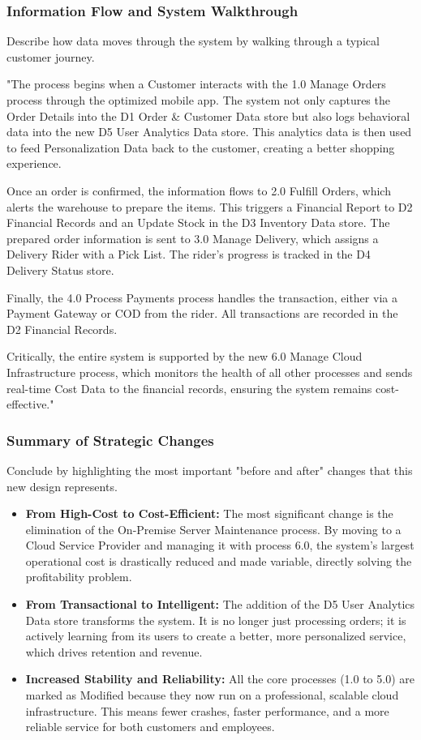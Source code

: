 \documentclass[12pt,a4paper]{article}
\begin{document}
\subsubsection{Information Flow and System Walkthrough}
Describe how data moves through the system by walking through a typical customer journey.

"The process begins when a Customer interacts with the 1.0 Manage Orders process through the optimized mobile app. The system not only captures the Order Details into the D1 Order \& Customer Data store but also logs behavioral data into the new D5 User Analytics Data store. This analytics data is then used to feed Personalization Data back to the customer, creating a better shopping experience.

Once an order is confirmed, the information flows to 2.0 Fulfill Orders, which alerts the warehouse to prepare the items. This triggers a Financial Report to D2 Financial Records and an Update Stock in the D3 Inventory Data store. The prepared order information is sent to 3.0 Manage Delivery, which assigns a Delivery Rider with a Pick List. The rider's progress is tracked in the D4 Delivery Status store.

Finally, the 4.0 Process Payments process handles the transaction, either via a Payment Gateway or COD from the rider. All transactions are recorded in the D2 Financial Records.

Critically, the entire system is supported by the new 6.0 Manage Cloud Infrastructure process, which monitors the health of all other processes and sends real-time Cost Data to the financial records, ensuring the system remains cost-effective."

\subsubsection{Summary of Strategic Changes}
Conclude by highlighting the most important "before and after" changes that this new design represents.

\begin{itemize}[leftmargin=*]
    \item \textbf{From High-Cost to Cost-Efficient:} The most significant change is the elimination of the On-Premise Server Maintenance process. By moving to a Cloud Service Provider and managing it with process 6.0, the system's largest operational cost is drastically reduced and made variable, directly solving the profitability problem.
    \item \textbf{From Transactional to Intelligent:} The addition of the D5 User Analytics Data store transforms the system. It is no longer just processing orders; it is actively learning from its users to create a better, more personalized service, which drives retention and revenue.
    \item \textbf{Increased Stability and Reliability:} All the core processes (1.0 to 5.0) are marked as Modified because they now run on a professional, scalable cloud infrastructure. This means fewer crashes, faster performance, and a more reliable service for both customers and employees.
\end{itemize}
\end{document}
